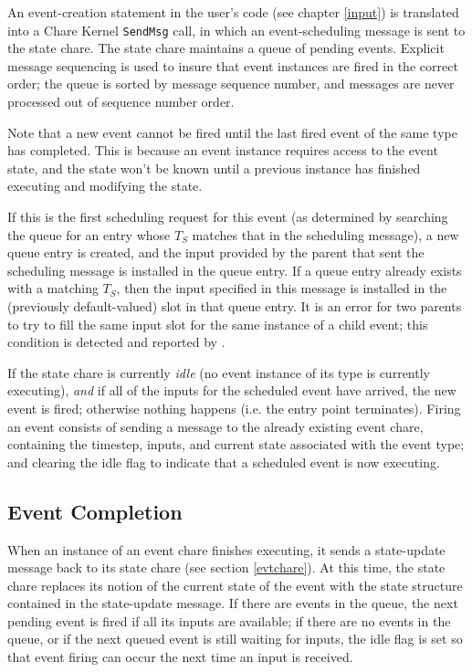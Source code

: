 An event-creation statement in the user's code (see chapter \ref{input})
is translated into a Chare Kernel {\tt SendMsg} call, in which an
event-scheduling message is sent to the state chare.  The state chare
maintains a queue of pending events.  Explicit message sequencing is
used to insure that event instances are fired in the correct order; the
queue is sorted by message sequence number, and messages are never
processed out of sequence number order.

Note that a new event cannot be fired until the last fired event of the
same type has completed.  This is because an event instance requires
access to the event state, and the state won't be known until a previous
instance has finished executing and modifying the state.

If this is the first scheduling request for this event (as determined by
searching the queue for an entry whose $T_S$ matches that in the
scheduling message), a new queue entry is created, and the input
provided by the parent that sent the scheduling message is installed in
the queue entry.  If a queue entry already exists with a matching
$T_S$, then the input specified in this message is installed in the
(previously default-valued) slot in that queue entry.  It is an error
for two parents to try to fill the same input slot for the same instance
of a child event; this condition is detected and reported  by \dispare.

If the state chare is currently {\em idle} (no event instance of its
type is currently executing), {\em and} if all of the inputs for the
scheduled event have arrived, the new event is fired; otherwise nothing
happens (i.e. the entry point terminates).  Firing an event consists of
sending a message to the already existing event chare, containing the
timestep, inputs, and current state associated with the event type; and
clearing the idle flag to indicate that a scheduled event is now executing.

\subsection{Event Completion}

When an instance of an event chare finishes executing, it sends a
state-update message back to its state chare (see section
\ref{evtchare}).  At this time, the state chare replaces its notion of
the current state of the event with the state structure contained in the
state-update message.  If there are events in the queue, the next
pending event is fired if all its inputs are available; if there are no
events in the queue, or if the next queued event is still waiting for
inputs, the idle flag is set so that event firing can occur the next
time an input is received.

